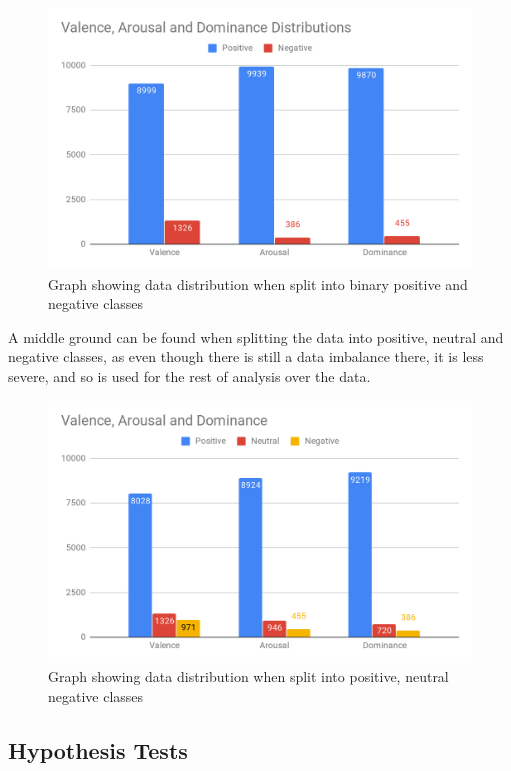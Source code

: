 \begin{figure}[h]
\caption{Graph showing data distribution when split into binary positive and negative classes}
\centering
\includegraphics[scale=0.3]{graphs/binaryDist.png}
\end{figure}

A middle ground can be found when splitting the data into positive, neutral and negative classes, as even though there is still a data imbalance there, it is less severe, and so is used for the rest of analysis over the data.

\begin{figure}[h]
\caption{Graph showing data distribution when split into positive, neutral negative classes}
\centering
\includegraphics[scale=0.3]{graphs/nonBinaryDist.png}
\end{figure}



\subsection{Hypothesis Tests}


